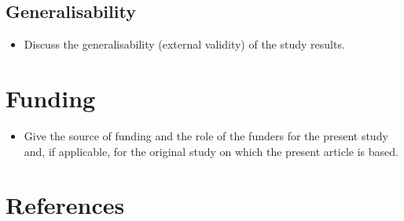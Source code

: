 \documentclass[
  letterpaper,
  DIV=11,
  numbers=noendperiod]{scrartcl}
\providecommand{\tightlist}{%
  \setlength{\itemsep}{0pt}\setlength{\parskip}{0pt}}\usepackage{longtable,booktabs,array}
\newlength{\cslhangindent}
\newlength{\cslentryspacingunit} %
\newenvironment{CSLReferences}[2] %
 {%
  \setlength{\parindent}{0pt}
  \ifodd #1
  \let\oldpar\par
  \def\par{\hangindent=\cslhangindent\oldpar}
  \fi
  \setlength{\parskip}{#2\cslentryspacingunit}
 }%
 {}
\begin{document}
\hypertarget{sec-general}{%
\subsection{Generalisability}\label{sec-general}}

\begin{itemize}
\tightlist
\item
  Discuss the generalisability (external validity) of the study results.
\end{itemize}

\newpage

\hypertarget{funding}{%
\section{Funding}\label{funding}}

\begin{itemize}
\tightlist
\item
  Give the source of funding and the role of the funders for the present
  study and, if applicable, for the original study on which the present
  article is based.
\end{itemize}

\newpage

\hypertarget{references}{%
\section*{References}\label{references}}

\hypertarget{refs}{}
\begin{CSLReferences}{0}{0}
\end{CSLReferences}
\end{document}
